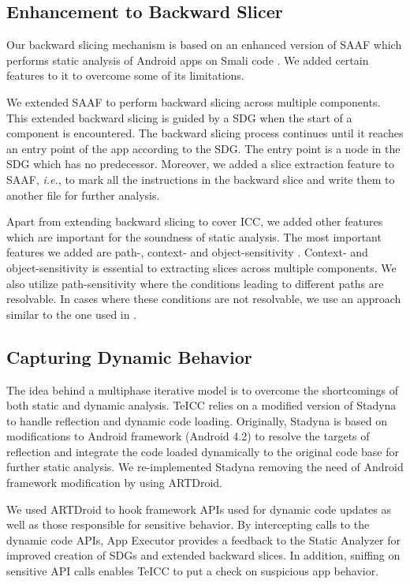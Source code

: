 \subsection{Enhancement to Backward Slicer}

Our backward slicing mechanism is based on an enhanced version of SAAF which performs static analysis of Android apps on Smali code \cite{hoffmann2013slicing}. We added certain features to it to overcome some of its limitations. 

We extended SAAF to perform backward slicing across multiple components. This extended backward slicing is guided by a SDG when the start of a component is encountered. The backward slicing process continues until it reaches an entry point of the app according to the SDG. The entry point is a node in the SDG which has no predecessor. Moreover, we added a slice extraction feature to SAAF, \textit{i.e.}, to mark all the instructions in the backward slice and write them to another file for further analysis.   

Apart from extending backward slicing to cover ICC, we added other features which are important for the soundness of static analysis. The most important features we added are path-, context- and object-sensitivity \cite{li2016static}. Context- and object-sensitivity is essential to extracting slices across multiple components. We also utilize path-sensitivity where the conditions leading to different paths are resolvable. In cases where these conditions are not resolvable, we use an approach similar to the one used in \cite{rasthofer2016harvesting}.

\subsection{Capturing Dynamic Behavior}

The idea behind a multiphase iterative model is to overcome the shortcomings of both static and dynamic analysis. TeICC relies on a modified version of Stadyna to handle reflection and dynamic code loading\cite{zhauniarovich2015stadyna}. Originally, Stadyna is based on modifications to Android framework (Android 4.2) to resolve the targets of reflection and integrate the code loaded dynamically to the original code base for further static analysis. We  re-implemented Stadyna removing the need of Android framework modification by using ARTDroid. 

We used ARTDroid to hook framework APIs used for dynamic code updates as well as those responsible for sensitive behavior. By intercepting calls to the dynamic code APIs, App Executor provides a feedback to the Static Analyzer for improved creation of SDGs and extended backward slices. In addition, sniffing on sensitive API calls enables TeICC to put a check on suspicious app behavior.       
